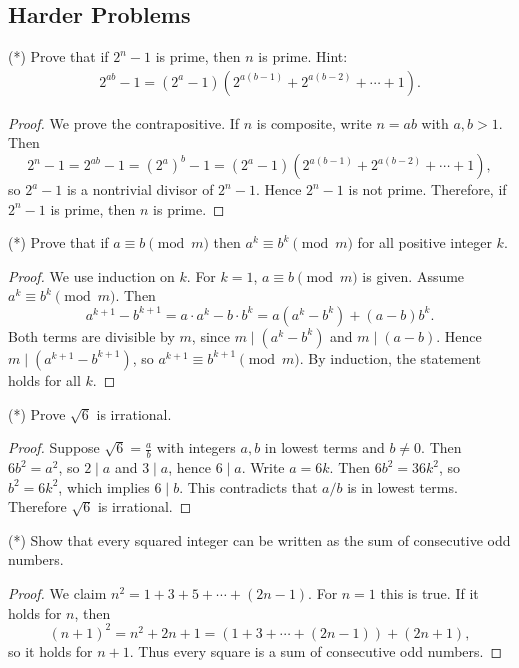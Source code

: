 \documentclass[12pt]{article}
\begin{document}
\subsection*{Harder Problems}

\begin{problem}
(*) Prove that if $2^n - 1$ is prime, then $n$ is prime. Hint:
\begin{align*}
    2^{ab} - 1 = (2^a - 1)(2^{a(b-1)} + 2^{a(b-2)} + \cdots + 1).
\end{align*}
\begin{proof}
We prove the contrapositive. If $n$ is composite, write $n=ab$ with $a,b>1$. Then
\[
2^n-1=2^{ab}-1=(2^a)^b-1=(2^a-1)\left(2^{a(b-1)}+2^{a(b-2)}+\cdots+1\right),
\]
so $2^a-1$ is a nontrivial divisor of $2^n-1$. Hence $2^n-1$ is not prime. Therefore, if $2^n-1$ is prime, then $n$ is prime.
\end{proof}
\end{problem}

\begin{problem}
(*) Prove that if $a \equiv b \pmod{m}$ then $a^k \equiv b^k \pmod{m}$ for all positive integer $k$.
\begin{proof}
We use induction on $k$. For $k=1$, $a\equiv b\pmod m$ is given. Assume $a^k\equiv b^k\pmod m$. Then
\[
a^{k+1}-b^{k+1}=a\cdot a^k-b\cdot b^k=a(a^k-b^k)+(a-b)b^k.
\]
Both terms are divisible by $m$, since $m\mid(a^k-b^k)$ and $m\mid(a-b)$. Hence $m\mid(a^{k+1}-b^{k+1})$, so $a^{k+1}\equiv b^{k+1}\pmod m$. By induction, the statement holds for all $k$.
\end{proof}
\end{problem}

\begin{problem}
(*) Prove $\sqrt{6}$ is irrational.
\begin{proof}
Suppose $\sqrt6=\frac{a}{b}$ with integers $a,b$ in lowest terms and $b\ne 0$. Then $6b^2=a^2$, so $2\mid a$ and $3\mid a$, hence $6\mid a$. Write $a=6k$. Then $6b^2=36k^2$, so $b^2=6k^2$, which implies $6\mid b$. This contradicts that $a/b$ is in lowest terms. Therefore $\sqrt6$ is irrational.
\end{proof}
\end{problem}

\begin{problem}
(*) Show that every squared integer can be written as the sum of consecutive odd numbers.
\begin{proof}
We claim $n^2=1+3+5+\cdots+(2n-1)$. For $n=1$ this is true. If it holds for $n$, then
\[
(n+1)^2=n^2+2n+1=(1+3+\cdots+(2n-1))+(2n+1),
\]
so it holds for $n+1$. Thus every square is a sum of consecutive odd numbers.
\end{proof}
\end{problem}
\end{document}
